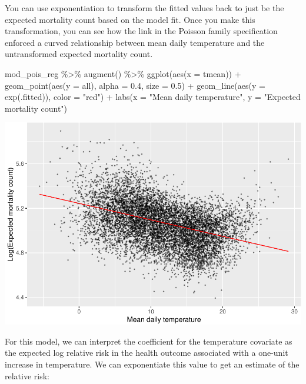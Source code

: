 \documentclass[
]{book}
\newenvironment{Shaded}{\begin{snugshade}}{\end{snugshade}}
\newcommand{\AttributeTok}[1]{\textcolor[rgb]{0.77,0.63,0.00}{#1}}
\newcommand{\FloatTok}[1]{\textcolor[rgb]{0.00,0.00,0.81}{#1}}
\newcommand{\FunctionTok}[1]{\textcolor[rgb]{0.00,0.00,0.00}{#1}}
\newcommand{\NormalTok}[1]{#1}
\newcommand{\SpecialCharTok}[1]{\textcolor[rgb]{0.00,0.00,0.00}{#1}}
\newcommand{\StringTok}[1]{\textcolor[rgb]{0.31,0.60,0.02}{#1}}
\begin{document}
You can use exponentiation to transform the fitted values back to just be the
expected mortality count based on the model fit. Once you make this
transformation, you can see how the link in the Poisson family specification
enforced a curved relationship between mean daily temperature and the
untransformed expected mortality count.

\begin{Shaded}
\begin{Highlighting}[]
\NormalTok{mod\_pois\_reg }\SpecialCharTok{\%\textgreater{}\%} 
  \FunctionTok{augment}\NormalTok{() }\SpecialCharTok{\%\textgreater{}\%} 
  \FunctionTok{ggplot}\NormalTok{(}\FunctionTok{aes}\NormalTok{(}\AttributeTok{x =}\NormalTok{ tmean)) }\SpecialCharTok{+} 
  \FunctionTok{geom\_point}\NormalTok{(}\FunctionTok{aes}\NormalTok{(}\AttributeTok{y =}\NormalTok{ all), }\AttributeTok{alpha =} \FloatTok{0.4}\NormalTok{, }\AttributeTok{size =} \FloatTok{0.5}\NormalTok{) }\SpecialCharTok{+} 
  \FunctionTok{geom\_line}\NormalTok{(}\FunctionTok{aes}\NormalTok{(}\AttributeTok{y =} \FunctionTok{exp}\NormalTok{(.fitted)), }\AttributeTok{color =} \StringTok{"red"}\NormalTok{) }\SpecialCharTok{+} 
  \FunctionTok{labs}\NormalTok{(}\AttributeTok{x =} \StringTok{"Mean daily temperature"}\NormalTok{, }\AttributeTok{y =} \StringTok{"Expected mortality count"}\NormalTok{)}
\end{Highlighting}
\end{Shaded}

\includegraphics{adv_epi_analysis_files/figure-latex/unnamed-chunk-32-1.pdf}

For this model, we can interpret the coefficient for the temperature covariate
as the expected log relative risk in the health outcome associated with a
one-unit increase in temperature. We can exponentiate this value to get an
estimate of the relative risk:
\end{document}
